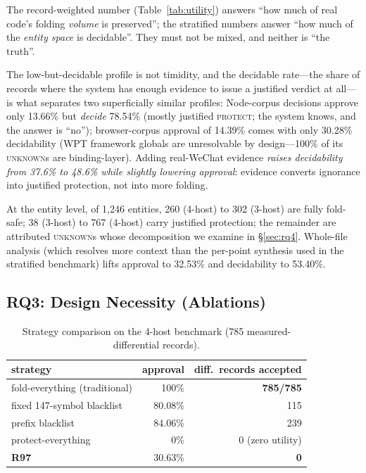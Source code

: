 \documentclass[sigconf,nonacm]{acmart}
\begin{document}
The record-weighted number (Table~\ref{tab:utility}) answers ``how much of real code's folding \emph{volume} is preserved''; the stratified numbers answer ``how much of the \emph{entity space} is decidable''. They must not be mixed, and neither is ``the truth''.

The low-but-decidable profile is not timidity, and the decidable rate---the share of records where the system has enough evidence to issue a justified verdict at all---is what separates two superficially similar profiles: Node-corpus decisions approve only 13.66\% but \emph{decide} 78.54\% (mostly justified \textsc{protect}; the system knows, and the answer is ``no''); browser-corpus approval of 14.39\% comes with only 30.28\% decidability (WPT framework globals are unresolvable by design---100\% of its \textsc{unknown}s are binding-layer). Adding real-WeChat evidence \emph{raises decidability from 37.6\% to 48.6\% while slightly lowering approval}: evidence converts ignorance into justified protection, not into more folding.

At the entity level, of 1{,}246 entities, 260 (4-host) to 302 (3-host) are fully fold-safe; 38 (3-host) to 767 (4-host) carry justified protection; the remainder are attributed \textsc{unknown}s whose decomposition we examine in \S\ref{sec:rq4}. Whole-file analysis (which resolves more context than the per-point synthesis used in the stratified benchmark) lifts approval to 32.53\% and decidability to 53.40\%.

\subsection{RQ3: Design Necessity (Ablations)}\label{sec:rq3}

\begin{table}[t]
  \centering
  \caption{Strategy comparison on the 4-host benchmark (785 measured-differential records).}
  \label{tab:strategy}
  \small
  \begin{tabular}{lrr}
    \toprule
    strategy & approval & diff.\ records accepted \\
    \midrule
    fold-everything (traditional) & 100\% & \textbf{785/785} \\
    fixed 147-symbol blacklist & 80.08\% & 115 \\
    prefix blacklist & 84.06\% & 239 \\
    protect-everything & 0\% & 0 (zero utility) \\
    \textbf{R97} & 30.63\% & \textbf{0} \\
    \bottomrule
  \end{tabular}
\end{table}
\end{document}
